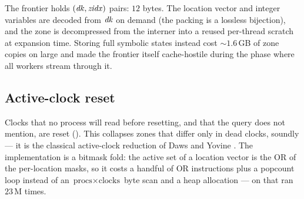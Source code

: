 The frontier holds $(\mathit{dk}, \mathit{zidx})$ pairs: $12$ bytes.  The location
vector and integer variables are decoded from $\mathit{dk}$ on demand (the packing is a
lossless bijection), and the zone is decompressed from the interner into a
reused per-thread scratch at expansion time.  Storing full symbolic states
instead cost $\sim1.6$\,GB of zone copies on large  and made the
frontier itself cache-hostile during the phase where all workers stream through
it.

\subsection{Active-clock reset}

Clocks that no process will read before resetting, and that the query does not
mention, are reset ().  This collapses zones that differ
only in dead clocks, soundly --- it is the classical active-clock reduction of
Daws and Yovine \cite{DawsYovine96}.  The implementation is a bitmask fold: the
active set of a location vector is the OR of the per-location masks, so it costs
a handful of OR instructions plus a popcount loop instead of an
$\text{procs} \times \text{clocks}$ byte scan and a heap allocation --- on
 that ran $23$\,M times.
